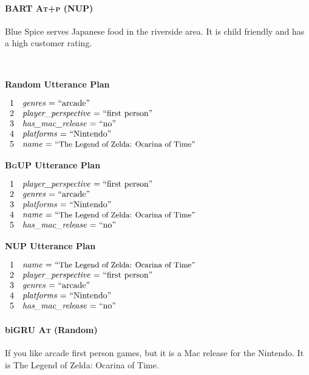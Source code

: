 \paragraph{BART \textsc{At+p} (NUP)}
Blue Spice serves Japanese food in the riverside area. It is child friendly and has a high customer rating.







~\\

\clearpage

\noindent
\parbox{.333\textwidth}{\textbf{Random Utterance Plan}}
$\begin{array}{ll}
1  &  \AV{genres}{arcade} \\
2  &  \AV{player\_perspective}{first person} \\
3  &  \AV{has\_mac\_release}{no} \\
4  &  \AV{platforms}{Nintendo} \\
5  &  \AV{name}{\small The Legend of Zelda: Ocarina of Time} \\
\end{array}$
~\\

\noindent
\parbox{.333\textwidth}{\textbf{\textsc{BgUP} Utterance Plan}}
$\begin{array}{ll}
1  &  \AV{player\_perspective}{first person} \\
2  &  \AV{genres}{arcade} \\
3  &  \AV{platforms}{Nintendo} \\
4  &  \AV{name}{\small The Legend of Zelda: Ocarina of Time} \\
5  &  \AV{has\_mac\_release}{no} \\
\end{array}$
~\\

\noindent
\parbox{.333\textwidth}{\textbf{\textsc{NUP} Utterance Plan}}
$\begin{array}{ll}
1  &  \AV{name}{\small The Legend of Zelda: Ocarina of Time} \\
2  &  \AV{player\_perspective}{first person} \\
3  &  \AV{genres}{arcade} \\
4  &  \AV{platforms}{Nintendo} \\
5  &  \AV{has\_mac\_release}{no} \\
\end{array}$
\paragraph{biGRU \textsc{At} (Random)}
If you like arcade first person games, but it is a Mac release for the Nintendo. It is The Legend of Zelda: Ocarina of Time.

